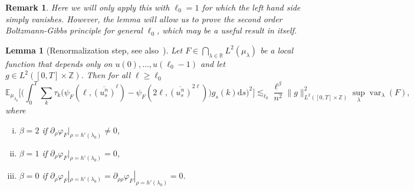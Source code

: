 \documentclass[11pt, a4paper]{article}
\newcommand{\mathd}{\mathrm{d}}
\newcommand{\tmop}[1]{\ensuremath{\operatorname{#1}}}
\newenvironment{enumerateroman}{\begin{enumerate}[i.] }{\end{enumerate}}
\newtheorem{lemma}[theorem]{Lemma}
\newtheorem{remark}[theorem]{Remark}
\newcommand{\1}{\mathbf{1}}
\begin{document}
\begin{remark}
  Here we will only apply this with $\ell_0 = 1$ for which the left
  hand side simply vanishes. However, the lemma will allow us to prove the
  second order Boltzmann-Gibbs principle for general $\ell_0$, which may be a
  useful result in itself.
\end{remark}

\begin{lemma}[Renormalization step, see also~{\cite[Lemma~2]{bib:goncalvesJara}}]
  Let $F \in \bigcap_{\lambda \in \mathbb{R}} L^2 ({\mu}_{\lambda})$
  be a local function that depends only on $u (0), \ldots, u (\ell_0 - 1)$ and
  let $g \in L^2 ([0, T] \times \mathbb{Z})$. Then for all $\ell \geqslant
  \ell_0$
  \[ \mathbb{E}_{{\mu}_{\lambda_0}} \Big[ \Big( \int_0^T \sum_k \tau_k
     \big( \psi_F ( \ell, \overline{(u^{n_{}}_s)}^{\ell} ) -
     \psi_F ( 2 \ell, \overline{(u^{n_{}}_s)}^{2 \ell} ) \big)
     g_s (k) \mathd s \Big)^2 \Big] \lesssim_{\ell_0}
     \frac{\ell^{\beta}}{n^2} \| g \|_{L^2 ([0, T] \times \mathbb{Z})}^2
     \sup_{\lambda} \tmop{var}_{\lambda} (F), \]
  where
  \begin{enumerateroman}
    \item $\beta = 2$ if $\partial_{\rho} \varphi_F |_{\rho = h' (\lambda_0)}
    \neq 0$,
    
    \item $\beta = 1$ if $\partial_{\rho} \varphi_F |_{\rho = h' (\lambda_0)}
    = 0$,
    
    \item $\beta = 0$ if $\partial_{\rho} \varphi_F |_{\rho = h' (\lambda_0)}
    = \partial_{\rho \rho} \varphi_F |_{\rho = h' (\lambda_0)} = 0$.
  \end{enumerateroman}
\end{lemma}
\end{document}
